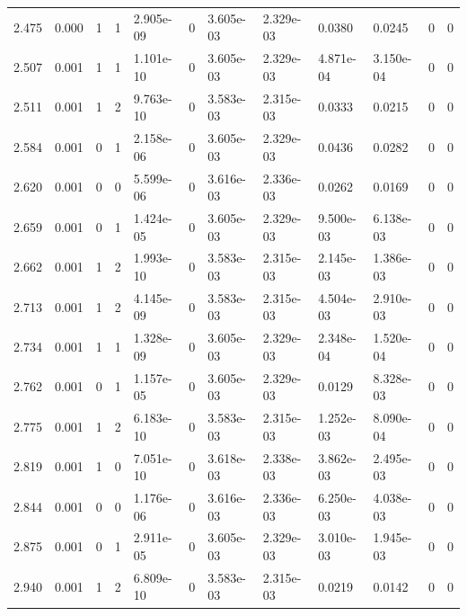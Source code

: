 \documentclass[preview]{standalone}
\begin{document}
{{{\begin{tabular}{L{1.2cm}C{1.2cm} C{0.3cm}C{0.5cm} C{1.4cm}C{1.4cm} C{1.4cm}C{1.4cm} C{1.6cm}C{1.6cm} C{1.6cm}C{1.6cm}}
  2.475  &  0.000  & 1     &  1 &  2.905e-09  & 0  &  3.605e-03&   2.329e-03& 0.0380 & 0.0245   &  0 & 0  \\ 
  2.507  &  0.001  & 1     &  1 &  1.101e-10  & 0  &  3.605e-03&   2.329e-03& 4.871e-04 & 3.150e-04   &  0 & 0  \\ 
  2.511  &  0.001  & 1     &  2 &  9.763e-10  & 0  &  3.583e-03&   2.315e-03& 0.0333 & 0.0215   &  0 & 0  \\ 
  2.584  &  0.001  & 0     &  1 &  2.158e-06  & 0  &  3.605e-03&   2.329e-03& 0.0436 & 0.0282   &  0 & 0  \\ 
  2.620  &  0.001  & 0     &  0 &  5.599e-06  & 0  &  3.616e-03&   2.336e-03& 0.0262 & 0.0169   &  0 & 0  \\ 
  2.659  &  0.001  & 0     &  1 &  1.424e-05  & 0  &  3.605e-03&   2.329e-03& 9.500e-03 & 6.138e-03   &  0 & 0  \\ 
  2.662  &  0.001  & 1     &  2 &  1.993e-10  & 0  &  3.583e-03&   2.315e-03& 2.145e-03 & 1.386e-03   &  0 & 0  \\ 
  2.713  &  0.001  & 1     &  2 &  4.145e-09  & 0  &  3.583e-03&   2.315e-03& 4.504e-03 & 2.910e-03   &  0 & 0  \\ 
  2.734  &  0.001  & 1     &  1 &  1.328e-09  & 0  &  3.605e-03&   2.329e-03& 2.348e-04 & 1.520e-04   &  0 & 0  \\ 
  2.762  &  0.001  & 0     &  1 &  1.157e-05  & 0  &  3.605e-03&   2.329e-03& 0.0129 & 8.328e-03   &  0 & 0  \\ 
  2.775  &  0.001  & 1     &  2 &  6.183e-10  & 0  &  3.583e-03&   2.315e-03& 1.252e-03 & 8.090e-04   &  0 & 0  \\ 
  2.819  &  0.001  & 1     &  0 &  7.051e-10  & 0  &  3.618e-03&   2.338e-03& 3.862e-03 & 2.495e-03   &  0 & 0  \\ 
  2.844  &  0.001  & 0     &  0 &  1.176e-06  & 0  &  3.616e-03&   2.336e-03& 6.250e-03 & 4.038e-03   &  0 & 0  \\ 
  2.875  &  0.001  & 0     &  1 &  2.911e-05  & 0  &  3.605e-03&   2.329e-03& 3.010e-03 & 1.945e-03   &  0 & 0  \\ 
  2.940  &  0.001  & 1     &  2 &  6.809e-10  & 0  &  3.583e-03&   2.315e-03& 0.0219 & 0.0142   &  0 & 0  \\ 
\hline 
\end{tabular} 

}}}
\end{document}
